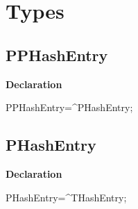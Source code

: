 \documentclass{report}
\newif\ifpdf
\begin{document}
\section{Types}
\ifpdf
\subsection*{\large{\textbf{PPHashEntry}}\normalsize\hspace{1ex}\hrulefill}
\else
\subsection*{PPHashEntry}
\fi
\label{PasDoc_Hashes-PPHashEntry}
\begin{list}{}{
\setlength{\itemindent}{0cm}
\setlength{\listparindent}{0cm}
\setlength{\leftmargin}{\evensidemargin}
\addtolength{\leftmargin}{\tmplength}
\settowidth{\labelsep}{X}
\addtolength{\leftmargin}{\labelsep}
\setlength{\labelwidth}{\tmplength}
}
\item[\textbf{Declaration}\hfill]
\ifpdf
\begin{flushleft}
\fi
\begin{ttfamily}
PPHashEntry={\^{}}PHashEntry;\end{ttfamily}

\ifpdf
\end{flushleft}
\fi

\end{list}
\ifpdf
\subsection*{\large{\textbf{PHashEntry}}\normalsize\hspace{1ex}\hrulefill}
\else
\subsection*{PHashEntry}
\fi
\label{PasDoc_Hashes-PHashEntry}
\begin{list}{}{
\setlength{\itemindent}{0cm}
\setlength{\listparindent}{0cm}
\setlength{\leftmargin}{\evensidemargin}
\addtolength{\leftmargin}{\tmplength}
\settowidth{\labelsep}{X}
\addtolength{\leftmargin}{\labelsep}
\setlength{\labelwidth}{\tmplength}
}
\item[\textbf{Declaration}\hfill]
\ifpdf
\begin{flushleft}
\fi
\begin{ttfamily}
PHashEntry={\^{}}THashEntry;\end{ttfamily}

\ifpdf
\end{flushleft}
\fi

\end{list}
\ifpdf
\end{document}
